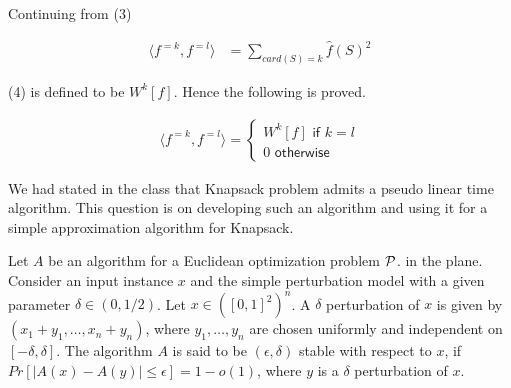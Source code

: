 \documentclass[12pt, a4paper, onecolumn]{exam}
\begin{document}
\begin{questions}
\begin{parts}
\begin{solution}
			Continuing from (3)

			\begin{align}
				\langle f^{=k}, f^{=l} \rangle & = \displaystyle\sum_{card(S) = k} \hat{f}(S)^2
			\end{align}

			(4) is defined to be $W^k[f]$. Hence the following is proved.

			\begin{align*}
				\langle f^{=k}, f^{=l} \rangle =
				\begin{cases}
					W^{k}[f] \textsf{ if } k = l \\
					0 \textsf{ otherwise}
				\end{cases}
			\end{align*}

		\end{solution}
	\end{parts}

	\question[10]  We had stated in the class that  Knapsack problem admits a pseudo linear time algorithm. This question is on developing such an algorithm and using it for a simple approximation algorithm for Knapsack.

	\question[10]  Let $A$ be an algorithm for a Euclidean optimization problem ${\cal P}$. in the plane. Consider  an input instance $x$ and the simple perturbation model with a given parameter $\delta\in (0,1/2)$.  Let $x\in ([0,1]^2)^n$. A $\delta$ perturbation of $x$ is given by $(x_1+y_1,\ldots, x_n+y_n)$, where $y_1,\ldots, y_n$ are chosen uniformly and independent on $[-\delta, \delta]$.  The  algorithm  $A$ is said to be $(\epsilon,\delta)$ stable with respect to $x$, if $Pr[|A(x) - A(y)|\le  \epsilon] = 1-o(1)$, where $y$ is a $\delta$ perturbation of $x$.


\end{questions}
\end{document}
